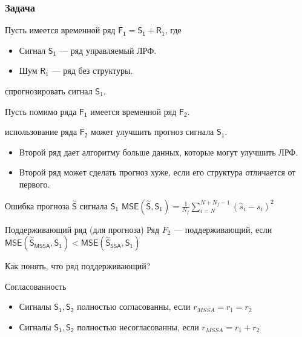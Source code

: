 \documentclass{beamer}
\begin{document}
    \begin{frame}
        \frametitle{Задача}

        Пусть имеется временной ряд $\mathsf{F_1 = S_1 + R_1}$, где
        \begin{itemize}
            \item Сигнал $\mathsf{S_1}$ --- ряд управляемый ЛРФ.
            \item Шум $\mathsf{R_1}$ --- ряд без структуры.
        \end{itemize} 

        спрогнозировать сигнал $\mathsf{S_1}$.

        Пусть помимо ряда $\mathsf{F_1}$ имеется временной ряд $\mathsf{F_2}$.

        использование ряда $\mathsf{F_2}$ может улучшить прогноз сигнала $\mathsf{S_1}$.

        \begin{itemize}
            \item Второй ряд дает алгоритму больше данных, которые могут улучшить ЛРФ.
            \item Второй ряд может сделать прогноз хуже, если его структура отличается от первого.
        \end{itemize}
    \end{frame}
    
    \begin{frame}
        \begin{block}{Ошибка прогноза $\overset{\sim}{\mathsf{S}}$ сигнала $\mathsf{S_1}$}
            $\mathsf{MSE(\overset{\sim}{S}, S_1)} = \frac{1}{N_{f}} \sum_{i = N}^{N + N_{f} - 1} (\overset{\sim}{s}_i - s_i)^2$
        \end{block}

        \begin{block}{Поддерживающий ряд (для прогноза)}
            Ряд $F_2$ --- поддерживающий, если $\mathsf{MSE(\overset{\sim}{S}_{MSSA}, S_1)} < \mathsf{MSE(\overset{\sim}{S}_{SSA}, S_1)}$
        \end{block}

         Как понять, что ряд поддерживающий? 

        \begin{block}{Согласованность}
            \begin{itemize}
                \item Сигналы $\mathsf{S_1, S_2}$ полностью согласованны, если $r_{MSSA} = r_1 = r_2$
                \item Сигналы $\mathsf{S_1, S_2}$ полностью несогласованны, если $r_{MSSA} = r_1 + r_2$
            \end{itemize}
        \end{block}

    \end{frame}
\end{document}
